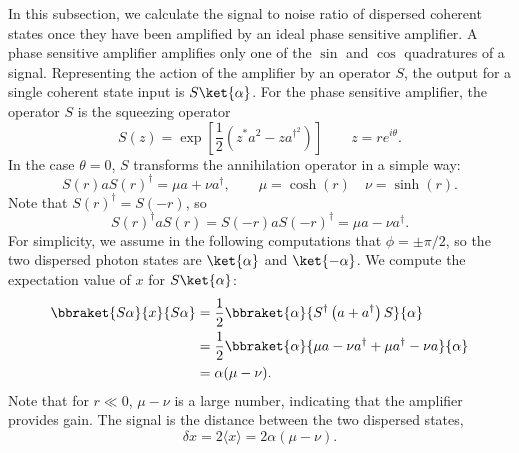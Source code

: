 
In this subsection, we calculate the signal to noise ratio of dispersed coherent states once they have been amplified by an ideal phase sensitive amplifier.
A phase sensitive amplifier amplifies only one of the $\sin$ and $\cos$ quadratures of a signal.
Representing the action of the amplifier by an operator $S$, the output for a single coherent state input is $S\ket{\alpha}$.
For the phase sensitive amplifier, the operator $S$ is the squeezing operator \begin{equation}
S(z) = \exp \left[ \frac{1}{2} \left( z^* a^2 - z a^{\dagger^2} \right) \right] \qquad z=re^{i\theta} . \end{equation}
In the case $\theta = 0$, $S$ transforms the annihilation operator in a simple way: \begin{equation}
S(r)aS(r)^{\dagger} = \mu a + \nu a^{\dagger} , \qquad \mu = \cosh(r) \quad \nu = \sinh(r) . \end{equation}
Note that $S(r)^{\dagger} = S(-r)$, so \begin{equation}
S(r)^{\dagger}aS(r) = S(-r)aS(-r)^{\dagger} = \mu a - \nu a^{\dagger} . \end{equation}
For simplicity, we assume in the following computations that $\phi = \pm \pi/2$, so the two dispersed photon states are $\ket{\alpha}$ and $\ket{-\alpha}$.
We compute the expectation value of $x$ for $S\ket{\alpha}$:
\begin{align}
\bbraket{S\alpha}{x}{S\alpha} &= \frac{1}{2} \bbraket{\alpha}{S^{\dagger} \left( a+a^{\dagger} \right)S}{\alpha} \\
&= \frac{1}{2} \bbraket{\alpha}{\mu a -\nu a^{\dagger} + \mu a^{\dagger} - \nu a}{\alpha} \\
&= \alpha ( \mu - \nu ) . \end{align}
Note that for $r \ll 0$, $\mu - \nu$ is a large number, indicating that the amplifier provides gain.
The signal is the distance between the two dispersed states, \begin{equation}
\delta x =2\langle x \rangle = 2\alpha(\mu - \nu) . \end{equation}

